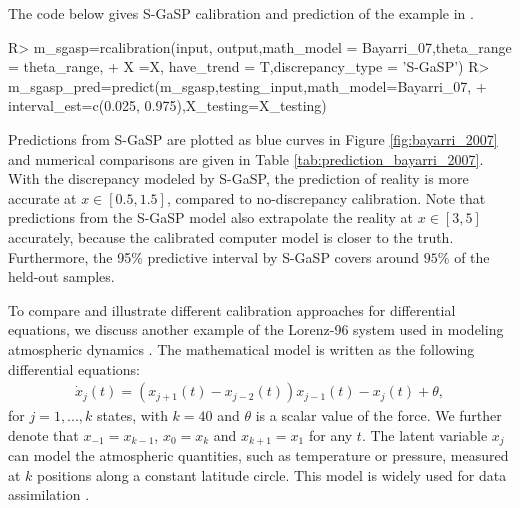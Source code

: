 {The code below gives S-GaSP calibration and prediction of the example in \cite{bayarri2007framework}}. 
\begin{example}
R> m_sgasp=rcalibration(input, output,math_model = Bayarri_07,theta_range = theta_range,
+                      X =X, have_trend = T,discrepancy_type = 'S-GaSP')
R> m_sgasp_pred=predict(m_sgasp,testing_input,math_model=Bayarri_07,
+                      interval_est=c(0.025, 0.975),X_testing=X_testing) 
\end{example}

Predictions from S-GaSP are plotted as blue curves in Figure  \ref{fig:bayarri_2007} and numerical comparisons are given in Table \ref{tab:prediction_bayarri_2007}. With the discrepancy modeled by S-GaSP, the prediction of reality is more accurate at $x \in [0.5,1.5]$, compared to no-discrepancy calibration.  Note that predictions from the S-GaSP model also extrapolate the reality at $x\in [3,5]$ accurately, because the calibrated computer model is  closer to the truth.  Furthermore, the 95\% predictive interval by S-GaSP covers around $95\%$ of the held-out samples. 



 
{To compare and illustrate different calibration approaches for  differential equations}, we discuss another example of  the Lorenz-96 system used in modeling atmospheric dynamics \citep{lorenz1996predictability}. The mathematical model is written as the following differential equations:  
\begin{align}
\dot x_j(t) = (x_{j+1}(t)-x_{j-2}(t))x_{j-1}(t) - x_j(t)  + \theta, 
 \end{align}
 for $j=1,...,k$ states, with $k=40$ and $\theta$ is a scalar value of the force. We further denote that $x_{-1}=x_{k-1}$, $x_0 = x_k$ and $x_{k+1}=x_{1}$ for any $t$. The latent variable $x_j$ can model the atmospheric quantities, such as temperature or pressure, measured at $k$ positions along a constant latitude circle. This model is widely used for data assimilation \citep{maclean2020surrogate,brajard2020combining}.
 

